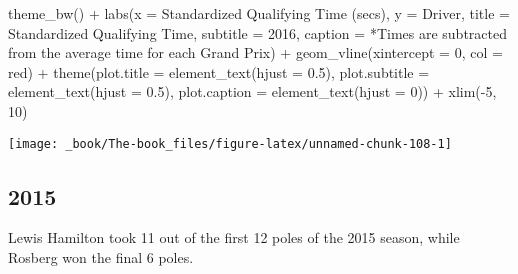\documentclass[
]{book}
\newenvironment{Shaded}{\begin{snugshade}}{\end{snugshade}}
\newcommand{\AttributeTok}[1]{\textcolor[rgb]{0.77,0.63,0.00}{#1}}
\newcommand{\DecValTok}[1]{\textcolor[rgb]{0.00,0.00,0.81}{#1}}
\newcommand{\FloatTok}[1]{\textcolor[rgb]{0.00,0.00,0.81}{#1}}
\newcommand{\FunctionTok}[1]{\textcolor[rgb]{0.00,0.00,0.00}{#1}}
\newcommand{\NormalTok}[1]{#1}
\newcommand{\SpecialCharTok}[1]{\textcolor[rgb]{0.00,0.00,0.00}{#1}}
\newcommand{\StringTok}[1]{\textcolor[rgb]{0.31,0.60,0.02}{#1}}
\begin{document}
\begin{Shaded}
\begin{Highlighting}[]
  \FunctionTok{theme\_bw}\NormalTok{() }\SpecialCharTok{+}
  \FunctionTok{labs}\NormalTok{(}\AttributeTok{x =} \StringTok{\textquotesingle{}Standardized Qualifying Time (secs)\textquotesingle{}}\NormalTok{,}
       \AttributeTok{y =} \StringTok{\textquotesingle{}Driver\textquotesingle{}}\NormalTok{,}
       \AttributeTok{title =} \StringTok{\textquotesingle{}Standardized Qualifying Time\textquotesingle{}}\NormalTok{,}
       \AttributeTok{subtitle =} \StringTok{\textquotesingle{}2016\textquotesingle{}}\NormalTok{,}
       \AttributeTok{caption =} \StringTok{\textquotesingle{}*Times are subtracted from the average time for each Grand Prix\textquotesingle{}}\NormalTok{) }\SpecialCharTok{+}
  \FunctionTok{geom\_vline}\NormalTok{(}\AttributeTok{xintercept =} \DecValTok{0}\NormalTok{, }\AttributeTok{col =} \StringTok{\textquotesingle{}red\textquotesingle{}}\NormalTok{) }\SpecialCharTok{+}
  \FunctionTok{theme}\NormalTok{(}\AttributeTok{plot.title =} \FunctionTok{element\_text}\NormalTok{(}\AttributeTok{hjust =} \FloatTok{0.5}\NormalTok{),}
        \AttributeTok{plot.subtitle =} \FunctionTok{element\_text}\NormalTok{(}\AttributeTok{hjust =} \FloatTok{0.5}\NormalTok{),}
        \AttributeTok{plot.caption =} \FunctionTok{element\_text}\NormalTok{(}\AttributeTok{hjust =} \DecValTok{0}\NormalTok{)) }\SpecialCharTok{+}
  \FunctionTok{xlim}\NormalTok{(}\SpecialCharTok{{-}}\DecValTok{5}\NormalTok{, }\DecValTok{10}\NormalTok{)}
\end{Highlighting}
\end{Shaded}

\begin{center}\texttt{[image: \_book/The-book\_files/figure-latex/unnamed-chunk-108-1]} \end{center}

\hypertarget{section-8}{%
\subsection{2015}\label{section-8}}

Lewis Hamilton took 11 out of the first 12 poles of the 2015 season, while Rosberg won the final 6 poles.
\end{document}

